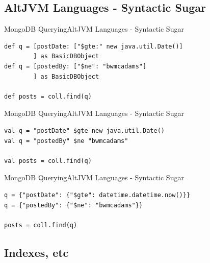 \documentclass{beamer}
\begin{document}
\subsection[Querying MongoDB]{AltJVM Languages - Syntactic Sugar}

\begin{frame}[fragile]{MongoDB Querying}{AltJVM Languages - Syntactic Sugar}
\begin{semiverbatim}
\begin{lstlisting}[label=groovy-sample,caption=Groovy Sample]
def q = [postDate: ["$gte:" new java.util.Date()]
        ] as BasicDBObject
def q = [postedBy: ["$ne": "bwmcadams"]
        ] as BasicDBObject

def posts = coll.find(q)
\end{lstlisting}
\end{semiverbatim}
\end{frame}

\begin{frame}[fragile]{MongoDB Querying}{AltJVM Languages - Syntactic Sugar}
\begin{semiverbatim}
\begin{lstlisting}[label=scala-sample,caption=Scala Sample]
val q = "postDate" $gte new java.util.Date()
val q = "postedBy" $ne "bwmcadams"

val posts = coll.find(q)
\end{lstlisting}
\end{semiverbatim}
\end{frame}

\begin{frame}[fragile]{MongoDB Querying}{AltJVM Languages - Syntactic Sugar}
\begin{semiverbatim}
\begin{lstlisting}[label=jython-sample,caption=Jython Sample]
q = {"postDate": {"$gte": datetime.datetime.now()}}
q = {"postedBy": {"$ne": "bwmcadams"}}

posts = coll.find(q)
\end{lstlisting}
\end{semiverbatim}
\end{frame}

\subsection[More Advanced MongoDB]{Indexes, etc}
\end{document}
